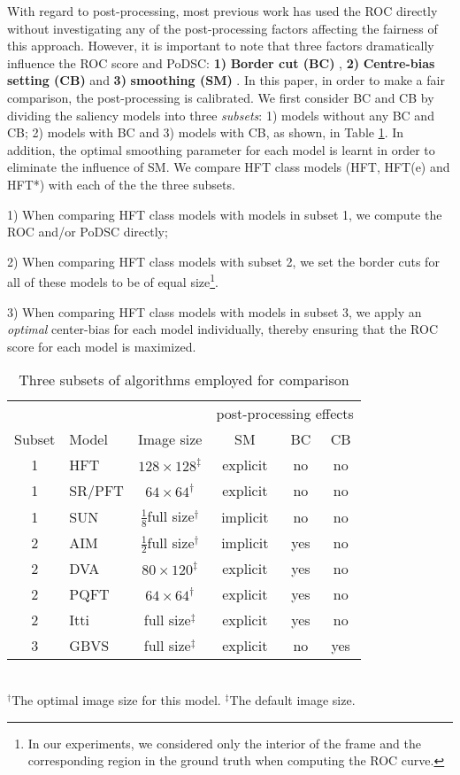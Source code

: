 \documentclass[10pt,journal,cspaper,compsoc]{IEEEtran}
\begin{document}
With regard to post-processing, most previous work has used the ROC directly without investigating any of the post-processing factors affecting the fairness of this approach. However, it is important to note that three factors dramatically influence the ROC score and PoDSC: {\bf 1)} {\bf Border cut (BC)} \cite{zhang2008sun}, {\bf 2)} {\bf Centre-bias setting (CB)} \cite{NIPS2006_897} and {\bf 3)} {\bf smoothing (SM)} \cite{ImageSignature2012,NIPS2006_897}.
In this paper, in order to make a fair comparison, the post-processing is calibrated. We first consider BC and CB by dividing the saliency models into three {\it subsets}: 1) models without any BC and CB; 2) models with BC and 3) models with CB, as shown, in Table \ref{alg_list}. In addition, the optimal smoothing parameter for each model is learnt in order to eliminate the influence of SM. We compare HFT class models (HFT, HFT(e) and HFT*) with each of the the three subsets.

1) When comparing HFT class models with models in subset 1, we compute the ROC and/or PoDSC directly;

2) When comparing HFT class models with subset 2, we set the border cuts for all of these models to be of equal size\footnote{In our experiments, we  considered only the interior of the frame and the corresponding region in the ground truth when computing the ROC curve.}.

3) When comparing HFT class models with models in subset 3, we apply an {\it optimal} center-bias for each model individually, thereby ensuring that the ROC score for each model is maximized.




\begin{table}[htbp] 	
\caption{Three subsets of algorithms employed for comparison}
\label{alg_list}	
\centering 	
\begin{tabular}{@{}clcccc@{}}
\toprule
&\multicolumn{1}{c}{}
&\multicolumn{1}{c}{}
&\multicolumn{3}{c}{post-processing effects}\\
 \cmidrule(lr){4-6}
\scriptsize{}  {Subset} & {Model} &  {Image size}
& {SM} & {BC} & {CB}\\
\midrule
1 &HFT  &$128\times128^{\ddag}$ & explicit & no & no\\
1 &SR/PFT  &$64\times64^{\dag}$ & explicit & no & no\\
1 &SUN   &$\frac{1}{8}$full size$^{\dag}$& implicit &  no & no\\
\midrule
2 &AIM  &  $\frac{1}{2}$full size$^{\dag}$& implicit & yes & no\\
2 &DVA  & $80\times120^{\ddag}$ & explicit & yes & no\\
2 &PQFT  &$64\times64^{\dag}$& explicit & yes & no\\
2 &Itti  & full size$^{\ddag}$ & explicit  & yes & no\\
\midrule
3 &GBVS  & full size$^{\ddag}$ & explicit  & no & yes\\
\bottomrule 	
\end{tabular}\\[2pt]
    \footnotesize
    $^{\dag}$The optimal image size for this model. $^{\ddag}$The default image size.
\end{table}
\end{document}
